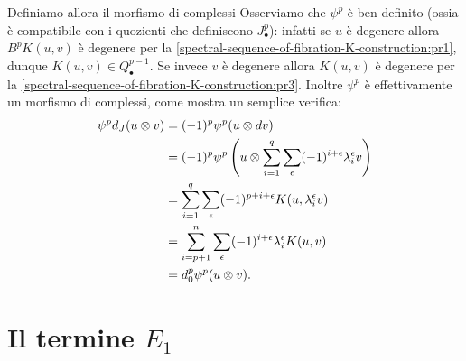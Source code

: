 Definiamo allora il morfismo di complessi
Osserviamo che $\psi^p$ è ben definito (ossia è compatibile con i quozienti che definiscono $J^p_\bullet$): infatti se $u$ è degenere allora $B^pK(u,v)$ è degenere per la \ref{spectral-sequence-of-fibration-K-construction:pr1}, dunque $K(u,v)\in Q^{p-1}_\bullet$. Se invece $v$ è degenere allora $K(u,v)$ è degenere per la \ref{spectral-sequence-of-fibration-K-construction:pr3}. Inoltre $\psi^p$ è effettivamente un morfismo di complessi, come mostra un semplice verifica:
\begin{align*}
\psi^pd_J(u\mathbin{\otimes} v)&=(-1)^p\psi^p(u\mathbin{\otimes} dv)\\
&=(-1)^p\psi^p\left(u\mathbin{\otimes}\sum_{i=1}^q\sum_\epsilon(-1)^{i+\epsilon}\lambda^\epsilon_iv\right)\\
&=\sum_{i=1}^q\sum_\epsilon(-1)^{p+i+\epsilon}K(u,\lambda^\epsilon_iv)\\
&=\sum_{i=p+1}^n\sum_\epsilon(-1)^{i+\epsilon}\lambda^\epsilon_iK(u,v)\\
&=d^p_0\psi^p(u\mathbin{\otimes} v).
\end{align*}

\section{Il termine \texorpdfstring{$E_1$}{E1}}

